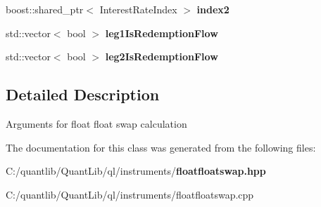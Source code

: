 \begin{DoxyCompactItemize}
\item 
boost\+::shared\+\_\+ptr$<$ Interest\+Rate\+Index $>$ {\bfseries index2}\label{class_quant_lib_1_1_float_float_swap_1_1arguments_ad2c1c4a90b8afef6f94ff7dbfb6cd1d0}

\item 
std\+::vector$<$ bool $>$ {\bfseries leg1\+Is\+Redemption\+Flow}\label{class_quant_lib_1_1_float_float_swap_1_1arguments_aedd957c4960e671c5d7414c0feea7b2b}

\item 
std\+::vector$<$ bool $>$ {\bfseries leg2\+Is\+Redemption\+Flow}\label{class_quant_lib_1_1_float_float_swap_1_1arguments_a5f5881eeabe69d6456c3907de68cf953}

\end{DoxyCompactItemize}


\subsection{Detailed Description}
Arguments for float float swap calculation 

The documentation for this class was generated from the following files\+:\begin{DoxyCompactItemize}
\item 
C\+:/quantlib/\+Quant\+Lib/ql/instruments/{\bf floatfloatswap.\+hpp}\item 
C\+:/quantlib/\+Quant\+Lib/ql/instruments/floatfloatswap.\+cpp\end{DoxyCompactItemize}
